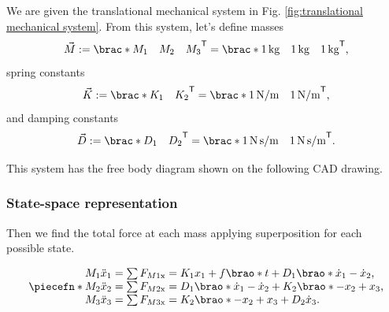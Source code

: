 \documentclass[12pt]{article}
\newcommand*\transpose{\mathsf{T}}
\DeclarePairedDelimiter\brao()%
\DeclarePairedDelimiter\brac[]%
\DeclarePairedDelimiter\piecefn\{.
\begin{document}
We are given the translational mechanical system in Fig. \ref{fig:translational mechanical system}. From this system, let's define masses
\begin{equation}
    \vec{M} := \brac*{
        \begin{matrix} M_1 & M_2 & M_3 \end{matrix}
    }^\transpose = \brac*{
        \begin{matrix} \SI1{\kilo\gram} & \SI1{\kilo\gram} & \SI1{\kilo\gram} \end{matrix}
    }^\transpose\rlap,
\end{equation}
spring constants
\begin{equation}
    \vec{K} := \brac*{
        \begin{matrix} K_1 & K_2 \end{matrix}
    }^\transpose = \brac*{
        \begin{matrix} \SI1{\newton\per\meter} & \SI1{\newton\per\meter} \end{matrix}
    }^\transpose\rlap,
\end{equation}
and damping constants
\begin{equation}
    \vec{D} := \brac*{
        \begin{matrix} D_1 & D_2 \end{matrix}
    }^\transpose = \brac*{
        \begin{matrix} \SI1{\newton\second\per\meter} & \SI1{\newton\second\per\meter} \end{matrix}
    }^\transpose\rlap.
\end{equation}

This system has the free body diagram shown on the following CAD drawing.


\subsubsection{State-space representation}

Then we find the total force at each mass applying superposition for each possible state.

\begin{equation}
    \piecefn*{
        \begin{array}{@{}l@{}}
            M_1 \ddot{x}_1 = \sum F_{M1\mathrm{x}} = K_1 x_1 + f\brao*t + D_1 \brao*{\dot{x}_1 - \dot{x}_2}\rlap,
        \\*
            M_2 \ddot{x}_2 = \sum F_{M2\mathrm{x}} = D_1\brao*{\dot{x}_1 - \dot{x}_2} + K_2\brao*{-x_2 + x_3}\rlap,
        \\*
            M_3 \ddot{x}_3 = \sum F_{M3\mathrm{x}} = K_2\brao*{-x_2 + x_3} + D_2\dot{x}_3\rlap.
        \\*
        \end{array}
    }
\end{equation}
\end{document}
